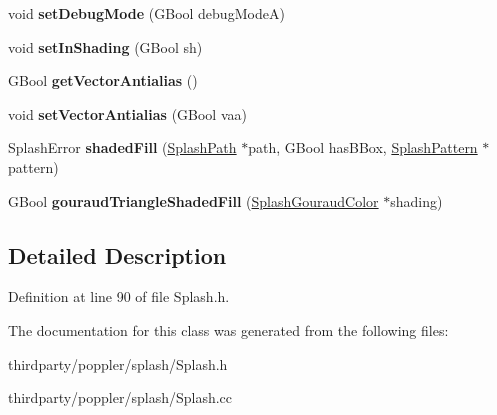 \begin{DoxyCompactItemize}
void {\bfseries set\+Debug\+Mode} (G\+Bool debug\+ModeA)
\item 
\mbox{\label{class_splash_a1d563ce860bb1bf3f1eb298ab759d75d}} 
void {\bfseries set\+In\+Shading} (G\+Bool sh)
\item 
\mbox{\label{class_splash_aae06c8d3b37439105ddeeb7d350600e2}} 
G\+Bool {\bfseries get\+Vector\+Antialias} ()
\item 
\mbox{\label{class_splash_a1baf1427f03fc80797125d324bb59be1}} 
void {\bfseries set\+Vector\+Antialias} (G\+Bool vaa)
\item 
\mbox{\label{class_splash_a67c9dbe2505660b09a4e963c209e0c6b}} 
Splash\+Error {\bfseries shaded\+Fill} (\hyperlink{class_splash_path}{Splash\+Path} $\ast$path, G\+Bool has\+B\+Box, \hyperlink{class_splash_pattern}{Splash\+Pattern} $\ast$pattern)
\item 
\mbox{\label{class_splash_a3b8e212507726bfb19c870e411d6b0c6}} 
G\+Bool {\bfseries gouraud\+Triangle\+Shaded\+Fill} (\hyperlink{class_splash_gouraud_color}{Splash\+Gouraud\+Color} $\ast$shading)
\end{DoxyCompactItemize}


\subsection{Detailed Description}


Definition at line 90 of file Splash.\+h.



The documentation for this class was generated from the following files\+:\begin{DoxyCompactItemize}
\item 
thirdparty/poppler/splash/Splash.\+h\item 
thirdparty/poppler/splash/Splash.\+cc\end{DoxyCompactItemize}
